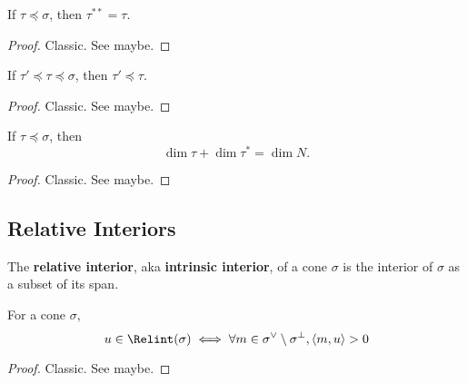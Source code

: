 \begin{proposition}
  \label{3-double-dual-face-dual-face}

  If $\tau \preceq \sigma$, then $\tau^{**} = \tau$.
\end{proposition}
\begin{proof}

  Classic. See \cite{Oda_1988} maybe.
\end{proof}


\begin{proposition}
  \label{3-dual-face-antitone}

  If $\tau' \preceq \tau \preceq \sigma$, then $\tau' \preceq \tau$.
\end{proposition}
\begin{proof}
  \uses{}

  Classic. See \cite{Oda_1988} maybe.
\end{proof}


\begin{proposition}
  \label{3-dim-dual-face}

  If $\tau \preceq \sigma$, then
  $$\dim \tau + \dim \tau^* = \dim N.$$
\end{proposition}
\begin{proof}
  \uses{}

  Classic. See \cite{Oda_1988} maybe.
\end{proof}


\subsection{Relative Interiors}


\begin{definition}
  \label{1-2-rel-interior}
  \uses{}
  \leanok

  The {\bf relative interior}, aka {\bf intrinsic interior}, of a cone $\sigma$ is the interior of $\sigma$ as a subset of its span.
\end{definition}


\begin{lemma}
  \label{1-2-rel-interior-inner}

  For a cone $\sigma$,
  $$u \in \Relint(\sigma) \iff \forall m \in \sigma^\vee \setminus \sigma^\perp, \langle m, u\rangle > 0$$
\end{lemma}
\begin{proof}
  \uses{}

  Classic. See \cite{Oda_1988} maybe.
\end{proof}


